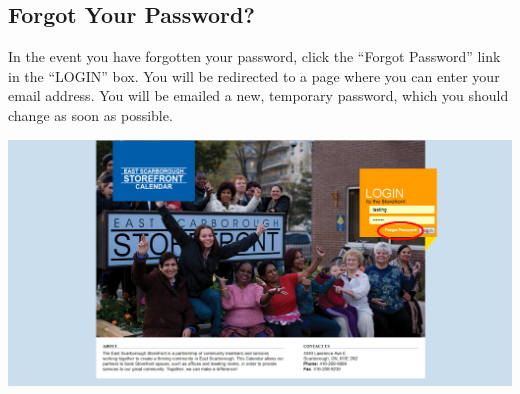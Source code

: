 \newpage


\subsection{Forgot Your Password?}

In the event you have forgotten your password, click the ``Forgot Password'' link in the ``LOGIN'' box. You will be redirected to a page where you can enter your email address. You will be emailed a new, temporary password, which you should change as soon as possible.

\includegraphics[width=\linewidth]{screenshots/img_forgotpass}



